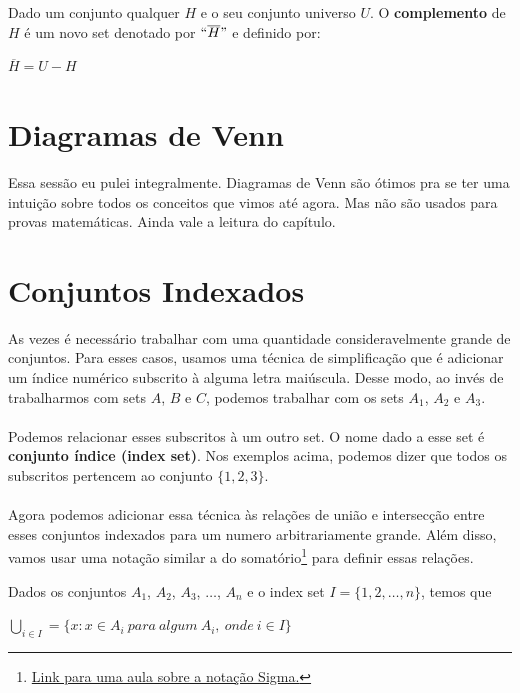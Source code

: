 \documentclass[main.tex]{subfiles}
\begin{document}
\begin{definition}[Complemento]
Dado um conjunto qualquer $H$ e o seu conjunto universo $U$. O \textbf{complemento} de $H$ é um novo set denotado por $``\overline{H}"$ e definido por:
\begin{center}
	$\overline{H} = U - H$
\end{center}
\end{definition}

\section{Diagramas de Venn}

Essa sessão eu pulei integralmente. Diagramas de Venn são ótimos pra se ter uma intuição sobre todos os conceitos que vimos até agora. Mas não são usados para provas matemáticas. Ainda vale a leitura do capítulo.

\section{Conjuntos Indexados}
As vezes é necessário trabalhar com uma quantidade consideravelmente grande de conjuntos. Para esses casos, usamos uma técnica de simplificação que é adicionar um índice numérico subscrito à alguma letra maiúscula. Desse modo, ao invés de trabalharmos com sets $A$, $B$ e $C$, podemos trabalhar com os sets $A_1$, $A_2$ e $A_3$.
\\~\\
Podemos relacionar esses subscritos à um outro set. O nome dado a esse set é \textbf{conjunto índice (index set)}. Nos exemplos acima, podemos dizer que todos os subscritos pertencem ao conjunto $\{ 1 , 2 , 3 \}$.
\\~\\
Agora podemos adicionar essa técnica às relações de união e intersecção entre esses conjuntos indexados para um numero arbitrariamente grande. Além disso, vamos usar uma notação similar a do somatório\footnote{\href{https://pt.khanacademy.org/math/algebra2/sequences-and-series/alg2-sigma-notation/v/sigma-notation-sum}{Link para uma aula sobre a notação Sigma.}} para definir essas relações.

\begin{definition}
Dados os conjuntos $A_1$, $A_2$, $A_3$, $\dots$, $A_n$ e o index set $I = \{ 1 , 2 , \dots , n \}$, temos que
\begin{center}
	$\bigcup_{i \in I}\limits = \{ x : x \in A_i \ para \ algum \ A_i, \ onde \  i \in I \}$
\end{center}
\end{definition}
\end{document}
